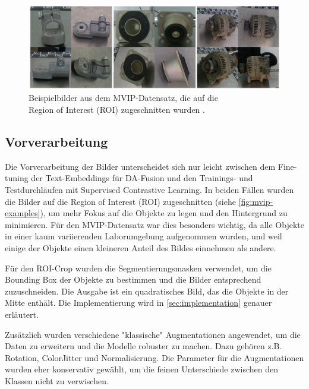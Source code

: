 \begin{figure}[h]
	\centering
	\includegraphics[width=\textwidth]{figure_mvip_ex_cropped_2.png}
	\caption[Beispielbilder aus dem MVIP-Datensatz, die auf die	Region of Interest (ROI) zugeschnitten wurden.]{Beispielbilder aus dem MVIP-Datensatz, die auf die\\
	Region of Interest (ROI) zugeschnitten wurden \parencite{Koch2023mvip}.}
	\label{fig:mvip-examples}
\end{figure}

\subsection{Vorverarbeitung} \label{subsec:preprocessing}

Die Vorverarbeitung der Bilder unterscheidet sich nur leicht zwischen dem Fine-tuning der Text-Embeddings für DA-Fusion und den Trainings- und Testdurchläufen mit Supervised Contrastive Learning. In beiden Fällen wurden die Bilder auf die Region of Interest (ROI) zugeschnitten (siehe \autoref{fig:mvip-examples}), um mehr Fokus auf die Objekte zu legen und den Hintergrund zu minimieren. Für den MVIP-Datensatz war dies besonders wichtig, da alle Objekte in einer kaum variierenden Laborumgebung aufgenommen wurden, und weil einige der Objekte einen kleineren Anteil des Bildes einnehmen als andere.

Für den ROI-Crop wurden die Segmentierungsmasken verwendet, um die Bounding Box der Objekte zu bestimmen und die Bilder entsprechend zuzuschneiden. Die Ausgabe ist ein quadratisches Bild, das die Objekte in der Mitte enthält. Die Implementierung wird in \autoref{sec:implementation} genauer erläutert.

Zusätzlich wurden verschiedene "klassische" Augmentationen angewendet, um die Daten zu erweitern und die Modelle robuster zu machen. Dazu gehören z.B. Rotation, ColorJitter und Normalisierung. Die Parameter für die Augmentationen wurden eher konservativ gewählt, um die feinen Unterschiede zwischen den Klassen nicht zu verwischen.

